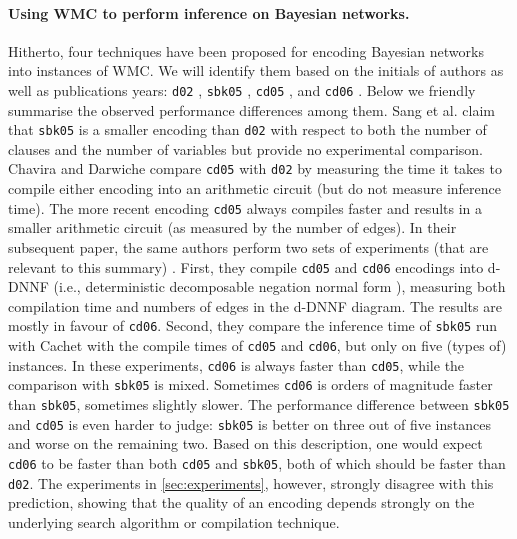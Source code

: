 \documentclass{article}
\theoremstyle{definition}
\theoremstyle{remark}
\begin{document}
\paragraph{Using WMC to perform inference on Bayesian networks.} Hitherto, four
techniques have been proposed for encoding Bayesian networks into instances of
WMC. We will identify them based on the initials of authors as well as
publications years: \texttt{d02} \cite{DBLP:conf/kr/Darwiche02}, \texttt{sbk05}
\cite{DBLP:conf/aaai/SangBK05}, \texttt{cd05} \cite{DBLP:conf/ijcai/ChaviraD05},
and \texttt{cd06} \cite{DBLP:conf/sat/ChaviraD06}. Below we friendly summarise
the observed performance differences among them. Sang et al.
\cite{DBLP:conf/aaai/SangBK05} claim that \texttt{sbk05} is a smaller encoding
than \texttt{d02} with respect to both the number of clauses and the number of
variables but provide no experimental comparison. Chavira and Darwiche
\cite{DBLP:conf/ijcai/ChaviraD05} compare \texttt{cd05} with \texttt{d02} by
measuring the time it takes to compile either encoding into an arithmetic
circuit (but do not measure inference time). The more recent encoding
\texttt{cd05} always compiles faster and results in a smaller arithmetic circuit
(as measured by the number of edges). In their subsequent paper, the same
authors perform two sets of experiments (that are relevant to this summary)
\cite{DBLP:conf/sat/ChaviraD06}. First, they compile \texttt{cd05} and
\texttt{cd06} encodings into d-DNNF (i.e., deterministic decomposable negation
normal form \cite{DBLP:journals/jancl/Darwiche01}), measuring both compilation
time and numbers of edges in the d-DNNF diagram. The results are mostly in
favour of \texttt{cd06}. Second, they compare the inference time of
\texttt{sbk05} run with Cachet \cite{DBLP:conf/sat/SangBBKP04} with the compile
times of \texttt{cd05} and \texttt{cd06}, but only on five (types of) instances.
In these experiments, \texttt{cd06} is always faster than \texttt{cd05}, while
the comparison with \texttt{sbk05} is mixed. Sometimes \texttt{cd06} is orders
of magnitude faster than \texttt{sbk05}, sometimes slightly slower. The
performance difference between \texttt{sbk05} and \texttt{cd05} is even harder
to judge: \texttt{sbk05} is better on three out of five instances and worse on
the remaining two. Based on this description, one would expect \texttt{cd06} to
be faster than both \texttt{cd05} and \texttt{sbk05}, both of which should be
faster than \texttt{d02}. The experiments in \cref{sec:experiments}, however,
strongly disagree with this prediction, showing that the quality of an encoding
depends strongly on the underlying search algorithm or compilation technique.
\end{document}
